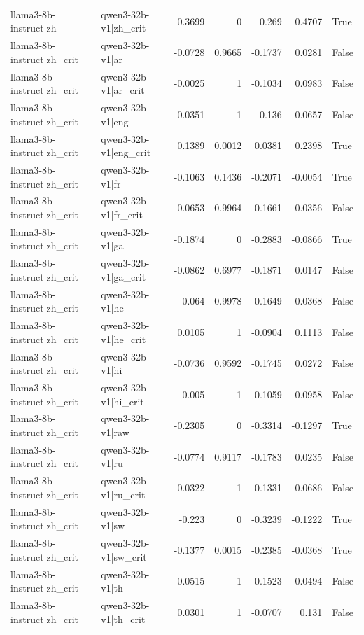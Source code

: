 \begin{table}
\begin{tabular}{l l r r r r l}
llama3-8b-instruct|zh & qwen3-32b-v1|zh_crit & 0.3699 & 0 & 0.269 & 0.4707 & True \\
llama3-8b-instruct|zh_crit & qwen3-32b-v1|ar & -0.0728 & 0.9665 & -0.1737 & 0.0281 & False \\
llama3-8b-instruct|zh_crit & qwen3-32b-v1|ar_crit & -0.0025 & 1 & -0.1034 & 0.0983 & False \\
llama3-8b-instruct|zh_crit & qwen3-32b-v1|eng & -0.0351 & 1 & -0.136 & 0.0657 & False \\
llama3-8b-instruct|zh_crit & qwen3-32b-v1|eng_crit & 0.1389 & 0.0012 & 0.0381 & 0.2398 & True \\
llama3-8b-instruct|zh_crit & qwen3-32b-v1|fr & -0.1063 & 0.1436 & -0.2071 & -0.0054 & True \\
llama3-8b-instruct|zh_crit & qwen3-32b-v1|fr_crit & -0.0653 & 0.9964 & -0.1661 & 0.0356 & False \\
llama3-8b-instruct|zh_crit & qwen3-32b-v1|ga & -0.1874 & 0 & -0.2883 & -0.0866 & True \\
llama3-8b-instruct|zh_crit & qwen3-32b-v1|ga_crit & -0.0862 & 0.6977 & -0.1871 & 0.0147 & False \\
llama3-8b-instruct|zh_crit & qwen3-32b-v1|he & -0.064 & 0.9978 & -0.1649 & 0.0368 & False \\
llama3-8b-instruct|zh_crit & qwen3-32b-v1|he_crit & 0.0105 & 1 & -0.0904 & 0.1113 & False \\
llama3-8b-instruct|zh_crit & qwen3-32b-v1|hi & -0.0736 & 0.9592 & -0.1745 & 0.0272 & False \\
llama3-8b-instruct|zh_crit & qwen3-32b-v1|hi_crit & -0.005 & 1 & -0.1059 & 0.0958 & False \\
llama3-8b-instruct|zh_crit & qwen3-32b-v1|raw & -0.2305 & 0 & -0.3314 & -0.1297 & True \\
llama3-8b-instruct|zh_crit & qwen3-32b-v1|ru & -0.0774 & 0.9117 & -0.1783 & 0.0235 & False \\
llama3-8b-instruct|zh_crit & qwen3-32b-v1|ru_crit & -0.0322 & 1 & -0.1331 & 0.0686 & False \\
llama3-8b-instruct|zh_crit & qwen3-32b-v1|sw & -0.223 & 0 & -0.3239 & -0.1222 & True \\
llama3-8b-instruct|zh_crit & qwen3-32b-v1|sw_crit & -0.1377 & 0.0015 & -0.2385 & -0.0368 & True \\
llama3-8b-instruct|zh_crit & qwen3-32b-v1|th & -0.0515 & 1 & -0.1523 & 0.0494 & False \\
llama3-8b-instruct|zh_crit & qwen3-32b-v1|th_crit & 0.0301 & 1 & -0.0707 & 0.131 & False \\

\end{tabular}
\end{table}
